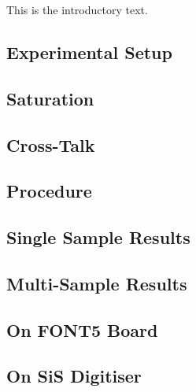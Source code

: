 
This is the introductory text.



\subsection{Experimental Setup}
\label{ss:sigGenSetup}

\subsection{Saturation}
\label{ss:monSaturation}

\subsection{Cross-Talk}
\label{ss:crossTalk}


\subsection{Procedure}
\label{ss:calProcedure}

\subsection{Single Sample Results}
\label{ss:calSingSamp}

\subsection{Multi-Sample Results}
\label{ss:calMultiSamp}


\subsection{On FONT5 Board}
\label{ss:font5Noise}

\subsection{On SiS Digitiser}
\label{ss:sisNoise}



